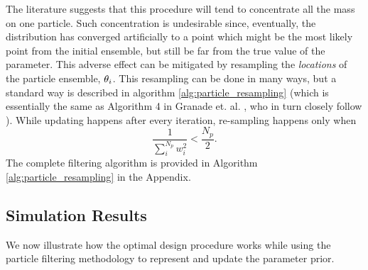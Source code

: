 The literature suggests that this procedure will tend to concentrate all the
mass on one particle. Such concentration is undesirable since, eventually, the
distribution has converged  artificially to a point which might be the most
likely point from the initial ensemble, but still be far from the true value
of the parameter. This adverse effect can be mitigated by resampling the {\sl
locations} of the particle ensemble, ${ \theta}_i$. This resampling can be done in
many ways, but a standard way is described in algorithm
\ref{alg:particle_resampling} (which is essentially the same as Algorithm 4 in
Granade et. al. \cite{Granade2012}, who in turn closely follow \cite{Liu2001}).
While updating happens after every iteration, re-sampling happens only when $$
\frac{1}{\sum_i^{N_p} w_i^2} < \frac {N_p}{2}. $$ The complete filtering
algorithm is provided in Algorithm \ref{alg:particle_resampling} in the
Appendix.



% 


\subsection{Simulation Results}
We now illustrate how the optimal design procedure works while using the
particle filtering methodology to represent and update the parameter prior.

